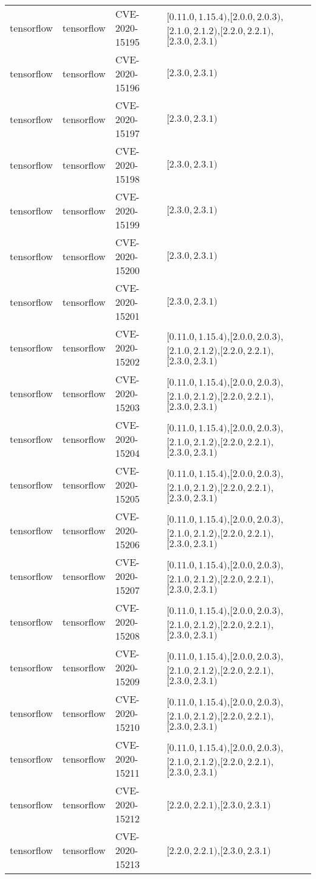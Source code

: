 \begin{tabular}{llll}
tensorflow & tensorflow & CVE-2020-15195 & $[0.11.0,1.15.4)$,$[2.0.0,2.0.3)$,$[2.1.0,2.1.2)$,$[2.2.0,2.2.1)$,$[2.3.0,2.3.1)$ \\
tensorflow & tensorflow & CVE-2020-15196 & $[2.3.0,2.3.1)$ \\
tensorflow & tensorflow & CVE-2020-15197 & $[2.3.0,2.3.1)$ \\
tensorflow & tensorflow & CVE-2020-15198 & $[2.3.0,2.3.1)$ \\
tensorflow & tensorflow & CVE-2020-15199 & $[2.3.0,2.3.1)$ \\
tensorflow & tensorflow & CVE-2020-15200 & $[2.3.0,2.3.1)$ \\
tensorflow & tensorflow & CVE-2020-15201 & $[2.3.0,2.3.1)$ \\
tensorflow & tensorflow & CVE-2020-15202 & $[0.11.0,1.15.4)$,$[2.0.0,2.0.3)$,$[2.1.0,2.1.2)$,$[2.2.0,2.2.1)$,$[2.3.0,2.3.1)$ \\
tensorflow & tensorflow & CVE-2020-15203 & $[0.11.0,1.15.4)$,$[2.0.0,2.0.3)$,$[2.1.0,2.1.2)$,$[2.2.0,2.2.1)$,$[2.3.0,2.3.1)$ \\
tensorflow & tensorflow & CVE-2020-15204 & $[0.11.0,1.15.4)$,$[2.0.0,2.0.3)$,$[2.1.0,2.1.2)$,$[2.2.0,2.2.1)$,$[2.3.0,2.3.1)$ \\
tensorflow & tensorflow & CVE-2020-15205 & $[0.11.0,1.15.4)$,$[2.0.0,2.0.3)$,$[2.1.0,2.1.2)$,$[2.2.0,2.2.1)$,$[2.3.0,2.3.1)$ \\
tensorflow & tensorflow & CVE-2020-15206 & $[0.11.0,1.15.4)$,$[2.0.0,2.0.3)$,$[2.1.0,2.1.2)$,$[2.2.0,2.2.1)$,$[2.3.0,2.3.1)$ \\
tensorflow & tensorflow & CVE-2020-15207 & $[0.11.0,1.15.4)$,$[2.0.0,2.0.3)$,$[2.1.0,2.1.2)$,$[2.2.0,2.2.1)$,$[2.3.0,2.3.1)$ \\
tensorflow & tensorflow & CVE-2020-15208 & $[0.11.0,1.15.4)$,$[2.0.0,2.0.3)$,$[2.1.0,2.1.2)$,$[2.2.0,2.2.1)$,$[2.3.0,2.3.1)$ \\
tensorflow & tensorflow & CVE-2020-15209 & $[0.11.0,1.15.4)$,$[2.0.0,2.0.3)$,$[2.1.0,2.1.2)$,$[2.2.0,2.2.1)$,$[2.3.0,2.3.1)$ \\
tensorflow & tensorflow & CVE-2020-15210 & $[0.11.0,1.15.4)$,$[2.0.0,2.0.3)$,$[2.1.0,2.1.2)$,$[2.2.0,2.2.1)$,$[2.3.0,2.3.1)$ \\
tensorflow & tensorflow & CVE-2020-15211 & $[0.11.0,1.15.4)$,$[2.0.0,2.0.3)$,$[2.1.0,2.1.2)$,$[2.2.0,2.2.1)$,$[2.3.0,2.3.1)$ \\
tensorflow & tensorflow & CVE-2020-15212 & $[2.2.0,2.2.1)$,$[2.3.0,2.3.1)$ \\
tensorflow & tensorflow & CVE-2020-15213 & $[2.2.0,2.2.1)$,$[2.3.0,2.3.1)$ \\

\end{tabular}
